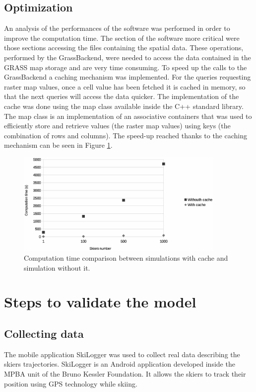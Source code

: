 \documentclass[12pt,a4paper,twoside]{book}
\begin{document}
\section{Optimization}
An analysis of the performances of the software was performed in order to improve the computation time. The section of the software more critical were those sections accessing the files containing the spatial data. These operations, performed by the GrassBackend, were needed to access the data contained in the GRASS map storage and are very time consuming. To speed up the calls to the GrassBackend a caching mechanism was implemented. For the queries requesting raster map values, once a cell value has been fetched it is cached in memory, so that the next queries will access the data quicker. The implementation of the cache was done using the map class available inside the C++ standard library. The map class is an implementation of an associative containers that was used to efficiently store and retrieve values (the raster map values) using keys (the combination of rows and columns). The speed-up reached thanks to the caching mechanism can be seen in Figure \ref{speed-up_cache}.

\begin{figure}[!h]
  \begin{center}
    \includegraphics[width=0.9\textwidth]{images/caching.eps}
    \caption{Computation time comparison between simulations with cache and simulation without it.}\label{speed-up_cache}
  \end{center}
\end{figure}

\chapter{Steps to validate the model}\label{steps_validate}
\section{Collecting data}
The mobile application SkiLogger was used to collect real data describing the skiers trajectories. SkiLogger is an Android application developed inside the MPBA unit of the Bruno Kessler Foundation. It allows the skiers to track their position using GPS technology while skiing.
\end{document}
